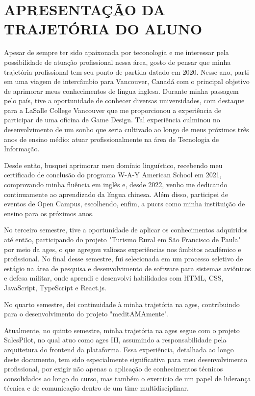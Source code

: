 \chapter[APRESENTAÇÃO DA TRAJETÓRIA DO ALUNO]{APRESENTAÇÃO DA TRAJETÓRIA DO ALUNO}

Apesar de sempre ter sido apaixonada por teconologia e me interessar pela possibilidade de atuação profissional nessa área, gosto de pensar que minha trajetória profissional tem seu ponto de partida datado em 2020. Nesse ano, parti em uma viagem de intercâmbio para Vancouver, Canadá com o principal objetivo de aprimorar meus conhecimentos de língua inglesa. Durante minha passagem pelo país, tive a oportunidade de conhecer diversas universidades, com destaque para a LaSalle College Vancouver que me proporcionou a experiência de participar de uma oficina de Game Design. Tal experiência culminou no desenvolvimento de um sonho que seria cultivado ao longo de meus próximos três anos de ensino médio: atuar profissionalmente na área de Tecnologia de Informação. 

Desde então, busquei aprimorar meu domínio linguístico, recebendo meu certificado de conclusão do programa W-A-Y American School em 2021, comprovando minha fluência em inglês e, desde 2022, venho me dedicando continuamente ao aprendizado da língua chinesa. Além disso, participei de eventos de Open Campus, escolhendo, enfim, a \ac{pucrs} como minha instituição de ensino para os próximos anos. 

No terceiro semestre, tive a oportunidade de aplicar os conhecimentos adquiridos até então, participando do projeto "Turismo Rural em São Francisco de Paula" por meio da \ac{ages}, o que agregou valiosas experiências nos âmbitos acadêmico e profissional. No final desse semestre, fui selecionada em um processo seletivo de estágio na área de pesquisa e desenvolvimento de software para sistemas aviônicos e defesa militar, onde aprendi e desenvolvi habilidades com HTML, CSS, JavaScript, TypeScript e React.js.

No quarto semestre, dei continuidade à minha trajetória na \ac{ages}, contribuindo para o desenvolvimento do projeto "meditAMAmente".

Atualmente, no quinto semestre, minha trajetória na \ac{ages} segue com o projeto SalesPilot, no qual atuo como \ac{ages} III, assumindo a responsabilidade pela arquitetura do frontend da plataforma. Essa experiência, detalhada ao longo deste documento, tem sido especialmente significativa para meu desenvolvimento profissional, por exigir não apenas a aplicação de conhecimentos técnicos consolidados ao longo do curso, mas também o exercício de um papel de liderança técnica e de comunicação dentro de um time multidisciplinar.
